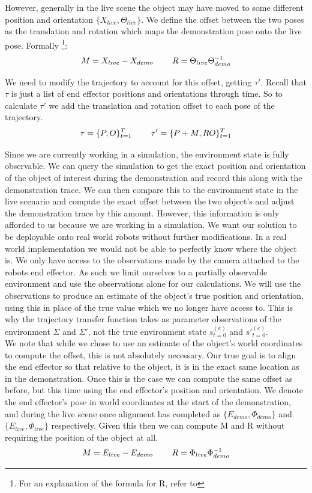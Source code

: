 However, generally in the live scene the object may have moved to some different position and orientation $\{X_{live}, \Theta_{live}\}$. We define the offset between the two poses as the translation and rotation which maps the demonstration pose onto the live pose. Formally \footnote{For an explanation of the formula for R, refer to }:
$$M = X_{live} - X_{demo} \operatorname{\operatorname{\: \: \: \:} \operatorname{\: \: \: \:}} R = \Theta_{live} \Theta_{demo}^{-1}$$ 

We need to modify the trajectory to account for this offset, getting $\tau'$. Recall that $\tau$ is just a list of end effector positions and orientations through time. So to calculate $\tau'$ we add the translation and rotation offset to each pose of the trajectory.
$$\tau = \{P, O\}_{t=1}^T \operatorname{\operatorname{\: \: \: \:} \operatorname{\: \: \: \:}} \tau' = \{P + M, RO\}_{t=1}^T$$

Since we are currently working in a simulation, the environment state is fully observable. We can query the simulation to get the exact position and orientation of the object of interest during the demonstration and record this along with the demonstration trace. We can then compare this to the environment state in the live scenario and compute the exact offset between the two object's and adjust the demonstration trace by this amount. However, this information is only afforded to us because we are working in a simulation. We want our solution to be deployable onto real world robots without further modifications. In a real world implementation we would not be able to perfectly know where the object is. We only have access to the observations made by the camera attached to the robots end effector. As such we limit ourselves to a partially observable environment and use the observations alone for our calculations. We will use the observations to produce an estimate of the object's true position and orientation, using this in place of the true value which we no longer have access to. This is why the trajectory transfer function takes as parameter observations of the environment $\Sigma$ and $\Sigma'$, not the true environment state $s^{(e)}_{t=0}$ and $s'^{(e)}_{t=0}$.\\

We note that while we chose to use an estimate of the object's world coordinates to compute the offset, this is not absolutely necessary. Our true goal is to align the end effector so that relative to the object, it is in the exact same location as in the demonstration. Once this is the case we can compute the same offset as before, but this time using the end effector's position and orientation. We denote the end effector's pose in world coordinates at the start of the demonstration, and during the live scene once alignment has completed as $\{E_{demo}, \Phi_{demo}\}$ and $\{E_{live}, \Phi_{live}\}$ respectively. Given this then we can compute M and R without requiring the position of the object at all.
$$M = E_{live} - E_{demo} \operatorname{\operatorname{\: \: \: \:} \operatorname{\: \: \: \:}} R = \Phi_{live} \Phi_{demo}^{-1}$$

